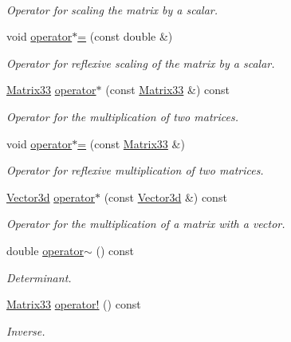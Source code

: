\begin{DoxyCompactItemize}
$$\begin{DoxyCompactList}\small\item\em \-Operator for scaling the matrix by a scalar. \end{DoxyCompactList}\item 
void \hyperlink{classMatrix33_a83162791813bef030b1ceb5df3c5cae3}{operator$\ast$=} (const double \&)
\begin{DoxyCompactList}\small\item\em \-Operator for reflexive scaling of the matrix by a scalar. \end{DoxyCompactList}\item 
\hyperlink{classMatrix33}{\-Matrix33} \hyperlink{classMatrix33_a525f14614255ff81c0cbab8060e8e065}{operator$\ast$} (const \hyperlink{classMatrix33}{\-Matrix33} \&) const 
\begin{DoxyCompactList}\small\item\em \-Operator for the multiplication of two matrices. \end{DoxyCompactList}\item 
void \hyperlink{classMatrix33_ac3937bdeb034cc83b4adcad16cd58a26}{operator$\ast$=} (const \hyperlink{classMatrix33}{\-Matrix33} \&)
\begin{DoxyCompactList}\small\item\em \-Operator for reflexive multiplication of two matrices. \end{DoxyCompactList}\item 
\hyperlink{classVector3d}{\-Vector3d} \hyperlink{classMatrix33_a601584a1edbaae7c6a2a2874605d6f61}{operator$\ast$} (const \hyperlink{classVector3d}{\-Vector3d} \&) const 
\begin{DoxyCompactList}\small\item\em \-Operator for the multiplication of a matrix with a vector. \end{DoxyCompactList}\item 
double \hyperlink{classMatrix33_a15b37caa6ab0d9f4a9f0d95846abd675}{operator$\sim$} () const 
\begin{DoxyCompactList}\small\item\em \-Determinant. \end{DoxyCompactList}\item 
\hyperlink{classMatrix33}{\-Matrix33} \hyperlink{classMatrix33_a1b822a20343a26b3c9bb7fd5c1247f37}{operator!} () const 
\begin{DoxyCompactList}\small\item\em \-Inverse. \end{DoxyCompactList}\end{DoxyCompactItemize}
